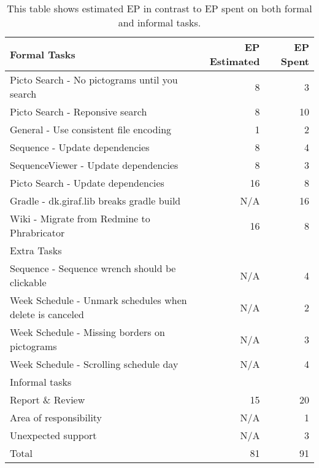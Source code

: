 \begin{table}[h]
    {\setlength{\extrarowheight}{1ex}%
    \begin{tabularx}{\textwidth}{X|r|r}
        \toprule
        Formal Tasks                                                  & EP Estimated & EP Spent     \\
        \midrule
        Picto Search - No pictograms until you search                 & 8            & 3            \\
        Picto Search - Reponsive search                               & 8            & 10           \\
        General - Use consistent file encoding                        & 1            & 2            \\
        Sequence - Update dependencies                                & 8            & 4            \\
        SequenceViewer - Update dependencies                          & 8            & 3            \\
        Picto Search - Update dependencies                            & 16           & 8            \\
        Gradle - dk.giraf.lib breaks gradle build                     & N/A          & 16           \\
        Wiki - Migrate from Redmine to Phrabricator                   & 16           & 8            \\
        \toprule
        Extra Tasks                                                   &              &              \\
        \midrule
        Sequence - Sequence wrench should be clickable                & N/A          & 4            \\
        Week Schedule - Unmark schedules when delete is canceled      & N/A          & 2            \\
        Week Schedule - Missing borders on pictograms                 & N/A          & 3            \\
        Week Schedule - Scrolling schedule day                        & N/A          & 4            \\
        \toprule
        Informal tasks                                                &              &              \\
        \midrule
        Report \& Review                                              & 15           & 20           \\      %
        Area of responsibility                                        & N/A          & 1            \\
        Unexpected support                                            & N/A          & 3            \\
        \midrule
        Total                                                         & 81           & 91           \\
        \bottomrule
    \end{tabularx}}
    \caption{This table shows estimated EP in contrast to EP spent on both formal and informal tasks.}
    \label{tab:sprint1tasktable}
\end{table}
